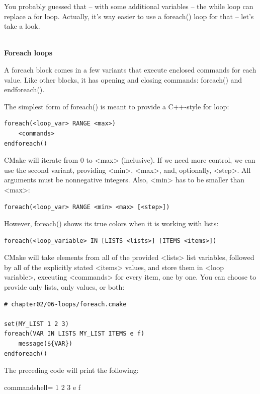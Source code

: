 You probably guessed that – with some additional variables – the while loop can replace a for loop. Actually, it's way easier to use a foreach() loop for that – let's take a look.

\hspace*{\fill} \\ %
\noindent
\textbf{Foreach loops}

A foreach block comes in a few variants that execute enclosed commands for each value. Like other blocks, it has opening and closing commands: foreach() and endforeach().

The simplest form of foreach() is meant to provide a C++-style for loop:

\begin{lstlisting}[style=styleCMake]
foreach(<loop_var> RANGE <max>)
	<commands>
endforeach()
\end{lstlisting}

CMake will iterate from 0 to <max> (inclusive). If we need more control, we can use the second variant, providing <min>, <max>, and, optionally, <step>. All arguments must be nonnegative integers. Also, <min> has to be smaller than <max>:

\begin{lstlisting}[style=styleCMake]
foreach(<loop_var> RANGE <min> <max> [<step>])
\end{lstlisting}

However, foreach() shows its true colors when it is working with lists:

\begin{lstlisting}[style=styleCMake]
foreach(<loop_variable> IN [LISTS <lists>] [ITEMS <items>])
\end{lstlisting}

CMake will take elements from all of the provided <lists> list variables, followed by all of the explicitly stated <items> values, and store them in <loop variable>, executing <commands> for every item, one by one. You can choose to provide only lists, only values, or both:

\begin{lstlisting}[style=styleCMake]
# chapter02/06-loops/foreach.cmake

set(MY_LIST 1 2 3)
foreach(VAR IN LISTS MY_LIST ITEMS e f)
	message(${VAR})
endforeach()
\end{lstlisting}

The preceding code will print the following:

\begin{tcblisting}{commandshell={}}
1 
2 
3 
e 
f
\end{tcblisting}

